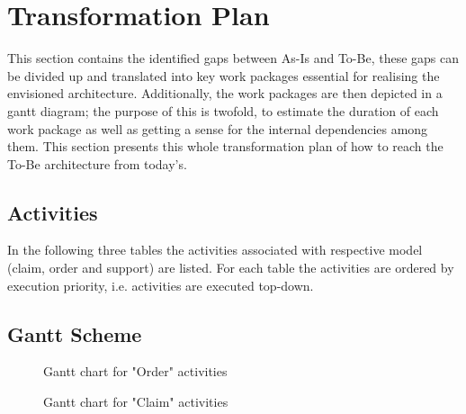 \section{Transformation Plan}
\label{sec:transformation_plan}
This section contains the identified gaps between As-Is and To-Be, these gaps can be divided up and translated into key work packages essential for realising the envisioned architecture. Additionally, the work packages are then depicted in a gantt diagram; the purpose of this is twofold, to estimate the duration of each work package as well as getting a sense for the internal dependencies among them. This section presents this whole transformation plan of how to reach the To-Be architecture from today's.

%
\subsection{Activities}
In the following three tables the activities associated with respective model (claim, order and support) are listed. For each table the activities are ordered by execution priority, i.e. activities are executed top-down.


\subsection{Gantt Scheme}
\begin{center}
	\begin{figure}[H]
		\centering
		\setlength\fboxsep{7pt}
		\setlength\fboxrule{0.5pt}
		\caption{Gantt chart for "Order" activities}
		\label{fig:gant_order}
	\end{figure}
\end{center}
\begin{center}
	\begin{figure}[H]
		\centering
		\setlength\fboxsep{7pt}
		\setlength\fboxrule{0.5pt}
		\caption{Gantt chart for "Claim" activities}
		\label{fig:gant_claim}
	\end{figure}
\end{center}

